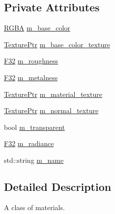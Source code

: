 \subsection*{Private Attributes}
\begin{DoxyCompactItemize}
\item 
\mbox{\hyperlink{structmage_1_1_r_g_b_a}{R\+G\+BA}} \mbox{\hyperlink{classmage_1_1rendering_1_1_material_aab907c723f66f06c8512014e7e217778}{m\+\_\+base\+\_\+color}}
\item 
\mbox{\hyperlink{namespacemage_1_1rendering_a6f3ae54f825328465b0cdde0f0de4a36}{Texture\+Ptr}} \mbox{\hyperlink{classmage_1_1rendering_1_1_material_aaee7a296b1f966a1544a07d21e13b8f6}{m\+\_\+base\+\_\+color\+\_\+texture}}
\item 
\mbox{\hyperlink{namespacemage_aa97e833b45f06d60a0a9c4fc22ae02c0}{F32}} \mbox{\hyperlink{classmage_1_1rendering_1_1_material_a14b420a0bdb8cb1f0fa57aa31bd09ae1}{m\+\_\+roughness}}
\item 
\mbox{\hyperlink{namespacemage_aa97e833b45f06d60a0a9c4fc22ae02c0}{F32}} \mbox{\hyperlink{classmage_1_1rendering_1_1_material_a1ec138a6dfec09ac421517480bd08a75}{m\+\_\+metalness}}
\item 
\mbox{\hyperlink{namespacemage_1_1rendering_a6f3ae54f825328465b0cdde0f0de4a36}{Texture\+Ptr}} \mbox{\hyperlink{classmage_1_1rendering_1_1_material_a4292698d8326e4f28dc45d59e00296dd}{m\+\_\+material\+\_\+texture}}
\item 
\mbox{\hyperlink{namespacemage_1_1rendering_a6f3ae54f825328465b0cdde0f0de4a36}{Texture\+Ptr}} \mbox{\hyperlink{classmage_1_1rendering_1_1_material_a14911430f38bc998c6d0735dc129f234}{m\+\_\+normal\+\_\+texture}}
\item 
bool \mbox{\hyperlink{classmage_1_1rendering_1_1_material_af9f8d0fdb613bce1a4c3683836649bf3}{m\+\_\+transparent}}
\item 
\mbox{\hyperlink{namespacemage_aa97e833b45f06d60a0a9c4fc22ae02c0}{F32}} \mbox{\hyperlink{classmage_1_1rendering_1_1_material_ac79fc4d9a669a552d7319ae713f25871}{m\+\_\+radiance}}
\item 
std\+::string \mbox{\hyperlink{classmage_1_1rendering_1_1_material_a384e553b40a96185760a1e298465e26a}{m\+\_\+name}}
\end{DoxyCompactItemize}


\subsection{Detailed Description}
A class of materials. 

